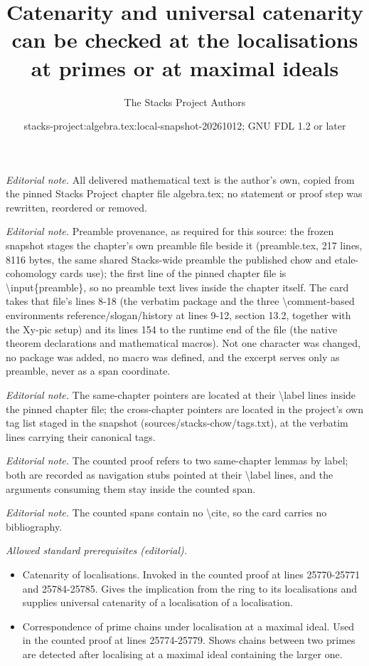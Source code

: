 \documentclass[10pt,a4paper]{amsart}
\title{Catenarity and universal catenarity can be checked at the localisations at primes or at maximal ideals}
\author{The Stacks Project Authors}
\date{stacks-project:algebra.tex:local-snapshot-20261012; GNU FDL 1.2 or later}
\theoremstyle{plain}
\theoremstyle{definition}
\theoremstyle{remark}
\numberwithin{equation}{subsection}
\begin{document}
\maketitle
\noindent\textit{Editorial note.} All delivered mathematical text is the author's own, copied from the pinned Stacks Project chapter file algebra.tex; no statement or proof step was rewritten, reordered or removed.\par\medskip
\noindent\textit{Editorial note.} Preamble provenance, as required for this source: the frozen snapshot stages the chapter's own preamble file beside it (preamble.tex, 217 lines, 8116 bytes, the same shared Stacks-wide preamble the published chow and etale-cohomology cards use); the first line of the pinned chapter file is \textbackslash{}input\{preamble\}, so no preamble text lives inside the chapter itself. The card takes that file's lines 8-18 (the verbatim package and the three \textbackslash{}comment-based environments reference/slogan/history at lines 9-12, section 13.2, together with the Xy-pic setup) and its lines 154 to the runtime end of the file (the native theorem declarations and mathematical macros). Not one character was changed, no package was added, no macro was defined, and the excerpt serves only as preamble, never as a span coordinate.\par\medskip
\noindent\textit{Editorial note.} The same-chapter pointers are located at their \textbackslash{}label lines inside the pinned chapter file; the cross-chapter pointers are located in the project's own tag list staged in the snapshot (sources/stacks-chow/tags.txt), at the verbatim lines carrying their canonical tags.\par\medskip
\noindent\textit{Editorial note.} The counted proof refers to two same-chapter lemmas by label; both are recorded as navigation stubs pointed at their \textbackslash{}label lines, and the arguments consuming them stay inside the counted span.\par\medskip
\noindent\textit{Editorial note.} The counted spans contain no \textbackslash{}cite, so the card carries no bibliography.\par\medskip
\noindent\textit{Allowed standard prerequisites (editorial).}\begin{itemize}
\item Catenarity of localisations. Invoked in the counted proof at lines 25770-25771 and 25784-25785. Gives the implication from the ring to its localisations and supplies universal catenarity of a localisation of a localisation.
\item Correspondence of prime chains under localisation at a maximal ideal. Used in the counted proof at lines 25774-25779. Shows chains between two primes are detected after localising at a maximal ideal containing the larger one.
\end{itemize}\medskip
\end{document}
